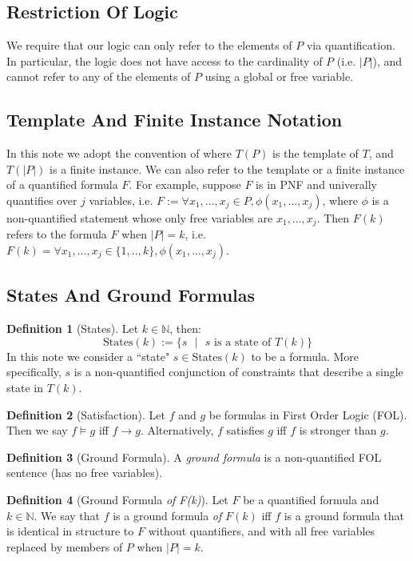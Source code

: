 \documentclass[12pt]{article}
\theoremstyle{definition}
\newtheorem{definition}{Definition}
\theoremstyle{remark}
\newcommand{\st}{\text{ }|\text{ }}
\newcommand{\states}{\text{States}}
\begin{document}
\subsection{Restriction Of Logic}
We require that our logic can only refer to the elements of $P$ via quantification.  In particular, the logic does not have access to the cardinality of $P$ (i.e. $|P|$), and cannot refer to any of the elements of $P$ using a global or free variable.

\subsection{Template And Finite Instance Notation}
In this note we adopt the convention of \cite{goel2021symmetry} where $T(P)$ is the template of $T$, and $T(|P|)$ is a finite instance.  We can also refer to the template or a finite instance of a quantified formula $F$.  For example, suppose $F$ is in PNF and univerally quantifies over $j$ variables, i.e. $F := \forall x_1,...,x_j \in P, \phi(x_1,...,x_j)$, where $\phi$ is a non-quantified statement whose only free variables are $x_1,...,x_j$.  Then $F(k)$ refers to the formula $F$ when $|P|=k$, i.e. $F(k) = \forall x_1,...,x_j \in \{1,..,k\}, \phi(x_1,...,x_j)$.

\subsection{States And Ground Formulas}
\begin{definition}[States]
  Let $k \in \mathbb{N}$, then:
  $$\states(k) := \{s \st s \text{ is a state of } T(k)\}$$
  In this note we consider a ``state" $s \in \states(k)$ to be a formula.  More specifically, $s$ is a non-quantified conjunction of constraints that describe a single state in $T(k)$.
\end{definition}

\begin{definition}[Satisfaction]
  Let $f$ and $g$ be formulas in First Order Logic (FOL).  Then we say $f \models g$ iff $f \rightarrow g$.  Alternatively, $f$ satisfies $g$ iff $f$ is stronger than $g$.
\end{definition}

\begin{definition}[Ground Formula]
  A \textit{ground formula} is a non-quantified FOL sentence (has no free variables).
\end{definition}

\begin{definition}[Ground Formula \textit{of F(k)}]
  Let $F$ be a quantified formula and $k \in \mathbb{N}$.  We say that $f$ is a ground formula \textit{of} $F(k)$ iff $f$ is a ground formula that is identical in structure to $F$ without quantifiers, and with all free variables replaced by members of $P$ when $|P|=k$.
\end{definition}
\end{document}
